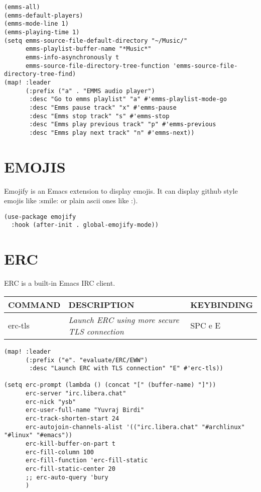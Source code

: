 \documentclass[11pt]{article}
\begin{document}
\begin{verbatim}
(emms-all)
(emms-default-players)
(emms-mode-line 1)
(emms-playing-time 1)
(setq emms-source-file-default-directory "~/Music/"
      emms-playlist-buffer-name "*Music*"
      emms-info-asynchronously t
      emms-source-file-directory-tree-function 'emms-source-file-directory-tree-find)
(map! :leader
      (:prefix ("a" . "EMMS audio player")
       :desc "Go to emms playlist" "a" #'emms-playlist-mode-go
       :desc "Emms pause track" "x" #'emms-pause
       :desc "Emms stop track" "s" #'emms-stop
       :desc "Emms play previous track" "p" #'emms-previous
       :desc "Emms play next track" "n" #'emms-next))
\end{verbatim}

\section{EMOJIS}
\label{sec:orgf4b1f64}
Emojify is an Emacs extension to display emojis. It can display github style emojis like :smile: or plain ascii ones like :).

\begin{verbatim}
(use-package emojify
  :hook (after-init . global-emojify-mode))
\end{verbatim}

\section{ERC}
\label{sec:org0416b53}
ERC is a built-in Emacs IRC client.

\begin{center}
\begin{tabular}{lll}
COMMAND & DESCRIPTION & KEYBINDING\\[0pt]
\hline
erc-tls & \emph{Launch ERC using more secure TLS connection} & SPC e E\\[0pt]
\end{tabular}
\end{center}

\begin{verbatim}
(map! :leader
      (:prefix ("e". "evaluate/ERC/EWW")
       :desc "Launch ERC with TLS connection" "E" #'erc-tls))

(setq erc-prompt (lambda () (concat "[" (buffer-name) "]"))
      erc-server "irc.libera.chat"
      erc-nick "ysb"
      erc-user-full-name "Yuvraj Birdi"
      erc-track-shorten-start 24
      erc-autojoin-channels-alist '(("irc.libera.chat" "#archlinux" "#linux" "#emacs"))
      erc-kill-buffer-on-part t
      erc-fill-column 100
      erc-fill-function 'erc-fill-static
      erc-fill-static-center 20
      ;; erc-auto-query 'bury
      )

\end{verbatim}
\end{document}

